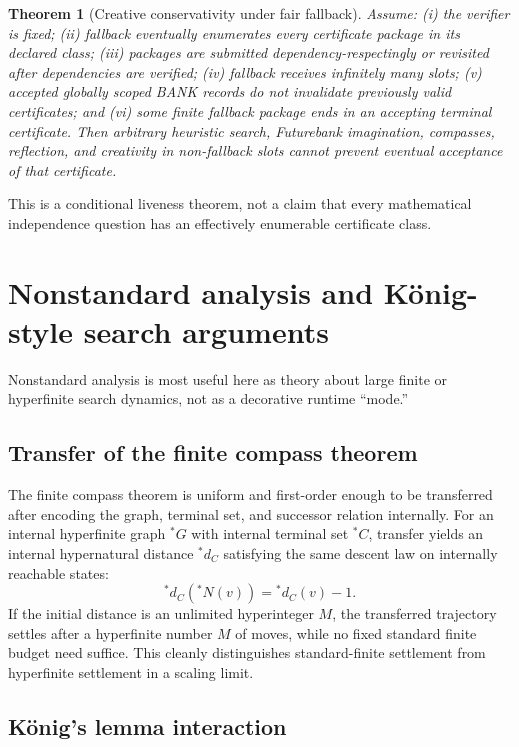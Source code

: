 \documentclass[11pt]{article}
\newtheorem{theorem}{Theorem}[section]
\begin{document}
\begin{theorem}[Creative conservativity under fair fallback]
Assume: (i) the verifier is fixed; (ii) fallback eventually enumerates every certificate package in its declared class; (iii) packages are submitted dependency-respectingly or revisited after dependencies are verified; (iv) fallback receives infinitely many slots; (v) accepted globally scoped BANK records do not invalidate previously valid certificates; and (vi) some finite fallback package ends in an accepting terminal certificate. Then arbitrary heuristic search, Futurebank imagination, compasses, reflection, and creativity in non-fallback slots cannot prevent eventual acceptance of that certificate.
\end{theorem}

This is a conditional liveness theorem, not a claim that every mathematical independence question has an effectively enumerable certificate class.

\section{Nonstandard analysis and K\"onig-style search arguments}

Nonstandard analysis is most useful here as theory about large finite or hyperfinite search dynamics, not as a decorative runtime ``mode.''

\subsection{Transfer of the finite compass theorem}

The finite compass theorem is uniform and first-order enough to be transferred after encoding the graph, terminal set, and successor relation internally. For an internal hyperfinite graph ${}^*G$ with internal terminal set ${}^*C$, transfer yields an internal hypernatural distance ${}^*d_C$ satisfying the same descent law on internally reachable states:
\[
{}^*d_C({}^*N(v))={}^*d_C(v)-1.
\]
If the initial distance is an unlimited hyperinteger $M$, the transferred trajectory settles after a hyperfinite number $M$ of moves, while no fixed standard finite budget need suffice. This cleanly distinguishes standard-finite settlement from hyperfinite settlement in a scaling limit.

\subsection{K\"onig's lemma interaction}
\end{document}
